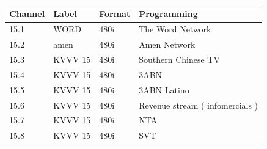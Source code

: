 \documentclass{article}
\begin{document}
\begin{tabular}{llll}
\toprule
Channel & Label & Format & Programming \\
\midrule
15.1 & WORD & 480i & The Word Network \\
15.2 & amen & 480i & Amen Network \\
15.3 & KVVV 15 & 480i & Southern Chinese TV \\
15.4 & KVVV 15 & 480i & 3ABN \\
15.5 & KVVV 15 & 480i & 3ABN Latino \\
15.6 & KVVV 15 & 480i & Revenue stream ( infomercials ) \\
15.7 & KVVV 15 & 480i & NTA \\
15.8 & KVVV 15 & 480i & SVT \\
\bottomrule
\end{tabular}
\end{document}
